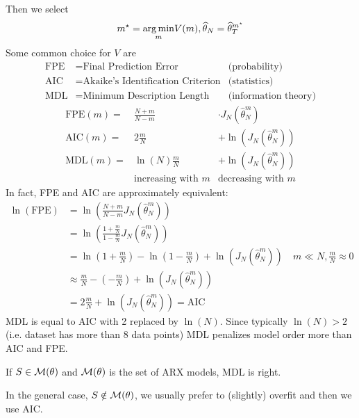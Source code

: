 Then we select
\begin{equation*}
m^{\star} =\underset{m}{\operatorname*{arg\,min}} V(m) ,\widehat{\theta }_{N} =\widehat{\theta }_{T}^{m^{\star}}
\end{equation*}
Some common choice for $V$ are
\begin{align*}
\text{FPE} & =\text{Final Prediction Error} & \text{(probability)}\\
\text{AIC} & =\text{Akaike's Identification Criterion} & \text{(statistics)}\\
\text{MDL} & =\text{Minimum Description Length} & \text{(information theory)}
\end{align*}
\begin{equation*}
	\begin{array}{rcc}
		\text{FPE}(m) = & \frac{N+m}{N-m}          &  \cdot J_{N}(\hat{\theta }_{N}^{m})\\
		\text{AIC}(m) = & 2\frac{m}{N}             &  +\ln(J_{N}(\hat{\theta }_{N}^{m}))\\
		\text{MDL}(m) = & \ln(N)\frac{m}{N}        &  +\ln(J_{N}(\hat{\theta }_{N}^{m}))\\
		                & \text{increasing with }m &  \text{decreasing with }m
	\end{array}
\end{equation*}
In fact, FPE and AIC are approximately equivalent:
\begin{align*}
\ln(\text{FPE}) & =\ln\left(\frac{N+m}{N-m} J_{N}(\hat{\theta }_{N}^{m})\right) \\
 & =\ln\left(\frac{1+\frac{m}{N}}{1-\frac{m}{N}} J_{N}(\hat{\theta }_{N}^{m})\right) \\
 & =\ln\left(1+\frac{m}{N}\right) -\ln\left(1-\frac{m}{N}\right) +\ln(J_{N}(\hat{\theta }_{N}^{m})) \quad m\ll N, \frac{m}{N} \approx 0\\
 & \approx \frac{m}{N} -\left(-\frac{m}{N}\right) +\ln(J_{N}(\hat{\theta }_{N}^{m})) \\
 & =2\frac{m}{N} +\ln(J_{N}(\hat{\theta }_{N}^{m})) = \text{AIC} & 
\end{align*}
MDL is equal to AIC with 2 replaced by $ \ln(N)$. Since typically $ \ln(N)  >2$ (i.e. dataset has more than 8 data points) MDL penalizes model order more than AIC and FPE.

\begin{rem}
    If $S\in\mathcal{M}(\theta)$ and $\mathcal{M}(\theta)$ is the set of ARX models, MDL is right.

    In the general case, $S\notin\mathcal{M}(\theta)$, we usually prefer to (slightly) overfit and then we use AIC.
\end{rem}

